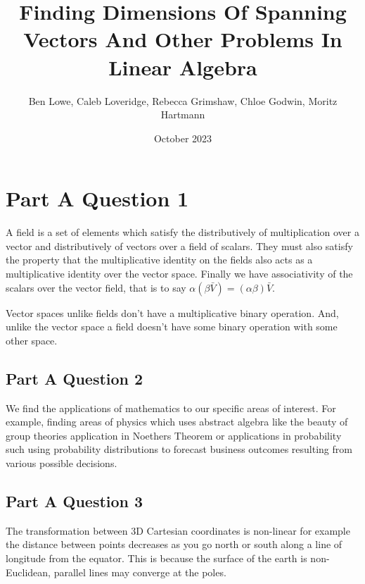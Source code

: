 \documentclass{article}
\title{Finding Dimensions Of Spanning Vectors And Other Problems In Linear Algebra}
\author{Ben Lowe, Caleb Loveridge, Rebecca Grimshaw, Chloe Godwin, Moritz Hartmann }
\date{October 2023}
\begin{document}
\maketitle

\tableofcontents

\break


\section{Part A Question 1}
A field is a set of elements which satisfy the distributively of multiplication over a vector and distributively of vectors over a field of scalars. They must also satisfy the property that the multiplicative identity on the fields also acts as a multiplicative identity over the vector space. Finally we have associativity of the scalars over the vector field, that is to say $\alpha (\beta \bar{V} )= (\alpha \beta ) \bar{V} $.

Vector spaces unlike fields don't have a multiplicative binary operation. And, unlike the vector space a field doesn't have some binary operation with some other space.

\subsection*{Part A Question 2}

We find the applications of mathematics to our specific areas of interest. For example, finding areas of physics which uses abstract algebra like the beauty of group theories application in Noethers Theorem or applications in probability such using probability distributions to forecast business outcomes resulting from various possible decisions. 

\subsection*{Part A Question 3}
The transformation between 3D Cartesian coordinates is non-linear for example the distance between points decreases as you go north or south along a line of longitude from the equator. This is because the surface of the earth is non-Euclidean, parallel lines may converge at the poles. 
\end{document}
